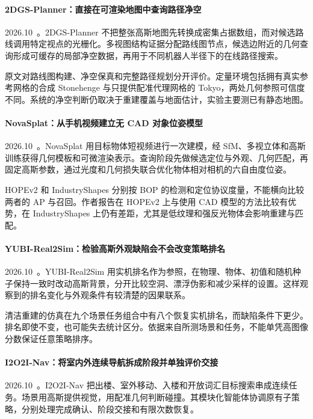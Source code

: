 \paragraph{2DGS-Planner：直接在可渲染地图中查询路径净空}
2026.10~\cite{2610_11752}。2DGS-Planner 不把整张高斯地图先转换成密集占据数组，而对候选路线调用特定视点的光栅化。多视图结构证据分配路线图节点，候选边附近的几何查询形成可缓存的局部净空数据，再用于不同机器人半径下的在线路径搜索。

原文对路线图构建、净空保真和完整路径规划分开评价。定量环境包括拥有真实参考网格的合成 Stonehenge 与只提供配准代理网格的 Tokyo，两处几何参照可信度不同。系统的净空判断仍取决于重建覆盖与地面估计，实验主要测已有静态地图。

\paragraph{NovaSplat：从手机视频建立无 CAD 对象位姿模型}
2026.10~\cite{2610_13309}。NovaSplat 用目标物体短视频进行一次建模，经 SfM、多视立体和高斯训练获得几何模板和可微渲染表示。查询阶段先做候选定位与外观、几何匹配，再固定高斯参数，通过光度和几何损失联合优化物体相对相机的六自由度位姿。

HOPEv2 和 IndustryShapes 分别按 BOP 的检测和定位协议度量，不能横向比较两者的 AP 与召回。作者报告在 HOPEv2 上与使用 CAD 模型的方法比较有优势，在 IndustryShapes 上仍有差距，尤其是低纹理和强反光物体会影响重建与匹配。

\paragraph{YUBI-Real2Sim：检验高斯外观缺陷会不会改变策略排名}
2026.10~\cite{2610_17521}。YUBI-Real2Sim 用实机排名作为参照，在物理、物体、初值和随机种子保持一致时改动高斯背景，分开比较空洞、漂浮伪影和减少采样的设置。这样观察到的排名变化与外观条件有较清楚的因果联系。

清洁重建的仿真在九个场景任务组合中有八个恢复实机排名，而缺陷条件下更少。排名即使不变，也可能失去统计区分。依据来自所测场景和任务，不能单凭高图像分数保证任意策略排序。

\paragraph{I2O2I-Nav：将室内外连续导航拆成阶段并单独评价交接}
2026.10~\cite{2610_18307}。I2O2I-Nav 把出楼、室外移动、入楼和开放词汇目标搜索串成连续任务。场景用高斯提供视觉，用配准几何判断碰撞。其模块化智能体协调原有子策略，分别处理完成确认、阶段交接和有限次数恢复。

